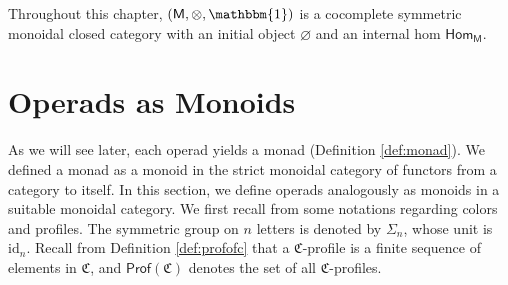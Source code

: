 \documentclass{amsbook}
\numberwithin{section}{chapter}
\numberwithin{subsection}{section}
\numberwithin{equation}{section}
\theoremstyle{plain}
\theoremstyle{definition}
\newcommand{\colorc}{\mathfrak{C}}
\newcommand{\Prof}{\mathsf{Prof}}
\newcommand{\Profc}{\Prof(\colorc)}
\newcommand{\M}{\mathsf{M}}
\newcommand{\Hom}{\mathsf{Hom}}
\newcommand{\Homm}{\Hom_{\M}}
\newcommand{\id}{\mathrm{id}}
\newcommand{\tensorunit}{\mathbbm{1}}
\begin{document}
Throughout this chapter, $(\M,\otimes,\tensorunit)$ is a cocomplete symmetric monoidal closed category with an initial object $\varnothing$ and an internal hom $\Homm$.  


\section{Operads as Monoids}\label{sec:operad-monoid}

As we will see later, each operad yields a monad (Definition \ref{def:monad}).  We defined a monad as a monoid in the strict monoidal category of functors from a category to itself.  In this section, we define operads analogously as monoids in a suitable monoidal category.  We first recall from \cite{bluemonster} some notations regarding colors and profiles.  The symmetric group on $n$ letters is denoted by\label{notation:sigman} $\Sigma_n$, whose unit is $\id_n$.  Recall from Definition \ref{def:profofc} that a $\colorc$-profile is a finite sequence of elements in $\colorc$, and $\Profc$ denotes the set of all $\colorc$-profiles.
\end{document}
